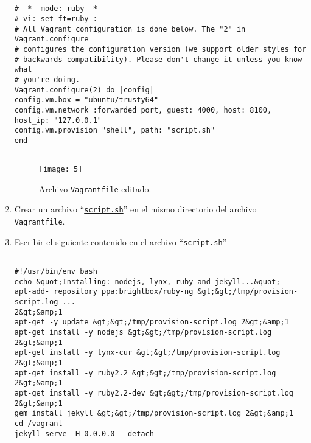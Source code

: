 \documentclass[10pt]{article}   			%
\begin{document}
\begin{enumerate}
	\begin{small}
		\begin{lstlisting}[frame=single]	
		
	
# -*- mode: ruby -*-
# vi: set ft=ruby :
# All Vagrant configuration is done below. The "2" in Vagrant.configure
# configures the configuration version (we support older styles for
# backwards compatibility). Please don't change it unless you know what
# you're doing.
Vagrant.configure(2) do |config|	
config.vm.box = "ubuntu/trusty64"
config.vm.network :forwarded_port, guest: 4000, host: 8100, host_ip: "127.0.0.1"
config.vm.provision "shell", path: "script.sh"
end
			
		\end{lstlisting}
	\end{small}
	
	
			\begin{figure}[H] 
				\centering
				\texttt{[image: 5]}   
				\caption{Archivo \texttt{Vagrantfile} editado.} 
			\end{figure}
			
\item Crear un archivo “\texttt{\href{https://github.com/wilrilo/talleres/blob/master/file/taller3/script.sh}{script.sh}}”  en el mismo directorio del archivo \texttt{Vagrantfile}.

\item Escribir el siguiente contenido en el archivo “\texttt{\href{https://github.com/wilrilo/talleres/blob/master/file/taller3/script.sh}{script.sh}}”
			
	
	
	\begin{small}
		\begin{lstlisting}[frame=single]	
		
#!/usr/bin/env bash	
echo &quot;Installing: nodejs, lynx, ruby and jekyll...&quot;
apt-add- repository ppa:brightbox/ruby-ng &gt;&gt;/tmp/provision-script.log ... 
2&gt;&amp;1
apt-get -y update &gt;&gt;/tmp/provision-script.log 2&gt;&amp;1
apt-get install -y nodejs &gt;&gt;/tmp/provision-script.log 2&gt;&amp;1
apt-get install -y lynx-cur &gt;&gt;/tmp/provision-script.log 2&gt;&amp;1
apt-get install -y ruby2.2 &gt;&gt;/tmp/provision-script.log 2&gt;&amp;1
apt-get install -y ruby2.2-dev &gt;&gt;/tmp/provision-script.log 2&gt;&amp;1
gem install jekyll &gt;&gt;/tmp/provision-script.log 2&gt;&amp;1
cd /vagrant
jekyll serve -H 0.0.0.0 - detach
		
		\end{lstlisting}
	\end{small}


\end{enumerate}
\end{document}
